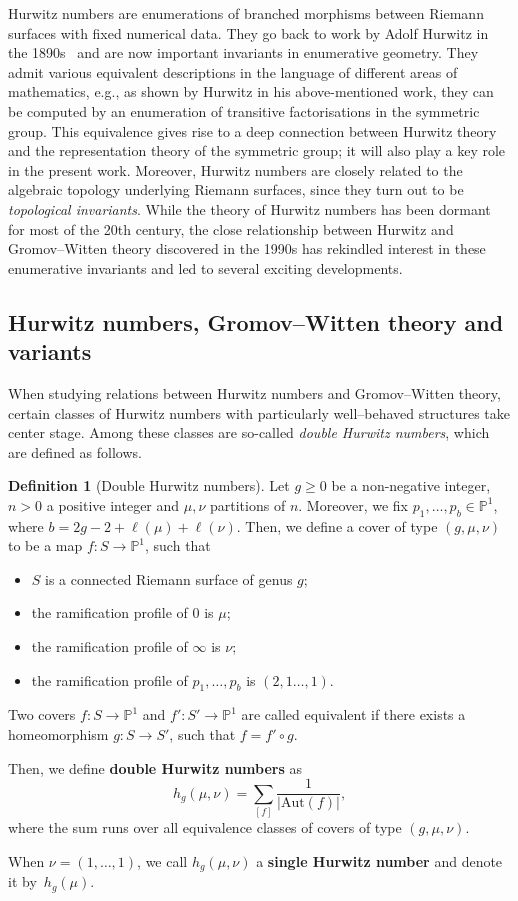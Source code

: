 \documentclass[11pt]{article}
\theoremstyle{definition}
\newtheorem{defi}[theo]{Definition}
\numberwithin{equation}{section}
\begin{document}
Hurwitz numbers are enumerations of branched morphisms between Riemann surfaces with fixed numerical data. They go back to work by Adolf Hurwitz in the 1890s~\cite{hurwitz1892algebraische} and are now important invariants in enumerative geometry. 
They admit various equivalent descriptions in the language of different areas of mathematics, e.g., as shown by Hurwitz in his above-mentioned work, they can be computed by an enumeration of transitive factorisations in the symmetric group. This equivalence gives rise to a deep connection between Hurwitz theory and the representation theory of the symmetric group; it will also play a key role in the present work. Moreover, Hurwitz numbers are closely related to the algebraic topology underlying Riemann surfaces, since they turn out to be \textit{topological invariants}. While the theory of Hurwitz numbers has been dormant for most of the 20th century, the close relationship between Hurwitz and Gromov--Witten theory discovered in the 1990s has rekindled interest in these enumerative invariants and led to several exciting developments.\vspace{\baselineskip}

\subsection{Hurwitz numbers, Gromov--Witten theory and variants}
When studying relations between Hurwitz numbers and Gromov--Witten theory, certain classes of Hurwitz numbers with particularly well--behaved structures take center stage. Among these classes are so-called \textit{double Hurwitz numbers}, which are defined as follows.

\begin{defi}[Double Hurwitz numbers]\label{def-hur}
Let $g\ge0$ be a non-negative integer, $n>0$ a positive integer and $\mu,\nu$ partitions of $n$. Moreover, we fix $p_1,\dots,p_b\in\mathbb{P}^1$, where $b=2g-2+\ell(\mu)+\ell(\nu)$. Then, we define a cover of type $(g,\mu,\nu)$ to be a map $f\colon S\to\mathbb{P}^1$, such that
\begin{itemize}
    \item $S$ is a connected Riemann surface of genus $g$;
    \item the ramification profile of $0$ is $\mu$;
    \item the ramification profile of $\infty$ is $\nu$;
    \item the ramification profile of $p_1,\dots,p_b$ is $(2,1\dots,1)$.
\end{itemize}
Two covers $f\colon S\to\mathbb{P}^1$ and $f'\colon S'\to\mathbb{P}^1$ are called equivalent if there exists a homeomorphism $g\colon S\to S'$, such that $f= f'\circ g$.

Then, we define \textbf{double Hurwitz numbers} as
\begin{equation*}
    h_g(\mu,\nu)=\sum_{[f]}\frac{1}{|\mathrm{Aut}(f)|},
\end{equation*}
where the sum runs over all equivalence classes of covers of type $(g,\mu,\nu)$.

When $\nu=(1,\dots,1)$, we call $h_g(\mu,\nu)$ a \textbf{single Hurwitz number} and denote it by~$h_g(\mu)$.
\end{defi}
\end{document}
